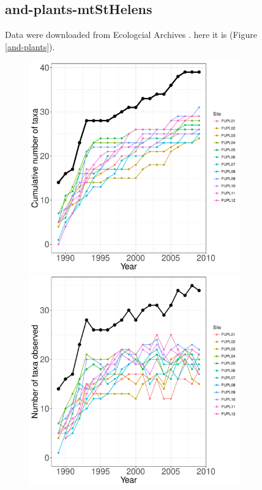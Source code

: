 \documentclass[11pt, oneside]{article}
\begin{document}
\begin{figure}[h!]
\subsection {and-plants-mtStHelens}
Data were downloaded from Ecologcial Archives \citep{and-plants}.
here it is (Figure \ref{and-plants}).

\begin{figure}[h!]
\centering
\includegraphics[scale = 0.4]{and-plants-mtStHelens_species_accumulation_curve.pdf}
\includegraphics[scale = 0.4]{and-plants-mtStHelens_num_taxa_over_time.pdf}

\end{figure}
\end{figure}
\end{document}
